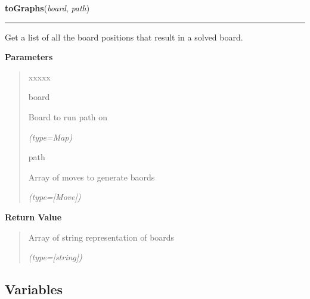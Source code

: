 \hspace{.8\funcindent}\begin{boxedminipage}{\funcwidth}

    \raggedright \textbf{toGraphs}(\textit{board}, \textit{path})

    \vspace{-1.5ex}

    \rule{\textwidth}{0.5\fboxrule}
\setlength{\parskip}{2ex}
    Get a list of all the board positions that result in a solved board.

\setlength{\parskip}{1ex}
      \textbf{Parameters}
      \vspace{-1ex}

      \begin{quote}
        \begin{Ventry}{xxxxx}

          \item[board]

          Board to run path on

            {\it (type=Map)}

          \item[path]

          Array of moves to generate baords

            {\it (type=[Move])}

        \end{Ventry}

      \end{quote}

      \textbf{Return Value}
    \vspace{-1ex}

      \begin{quote}
      Array of string representation of boards

      {\it (type=[string])}

      \end{quote}

    \end{boxedminipage}



  \subsection{Variables}

